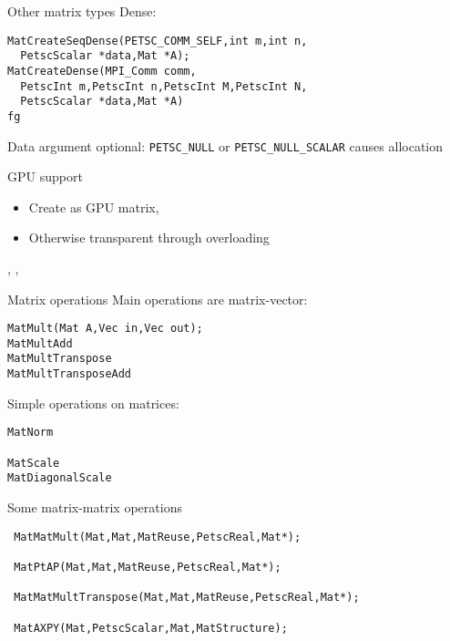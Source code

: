 \begin{details}
\begin{numberedframe}{Other matrix types}
Dense:
\begin{lstlisting}
MatCreateSeqDense(PETSC_COMM_SELF,int m,int n,
  PetscScalar *data,Mat *A);
MatCreateDense(MPI_Comm comm,
  PetscInt m,PetscInt n,PetscInt M,PetscInt N,
  PetscScalar *data,Mat *A)
fg\end{lstlisting}
Data argument optional:
\lstinline{PETSC_NULL} or \lstinline{PETSC_NULL_SCALAR} causes allocation
\end{numberedframe}

\begin{numberedframe}{GPU support}
  \begin{itemize}
  \item Create as GPU matrix,
  \item Otherwise transparent through overloading
  \end{itemize}
,
,
\end{numberedframe}

\begin{numberedframe}{}
\end{numberedframe}

\begin{comment}
  \begin{numberedframe}{}
    \cverbatimsnippet{pccudaallocsp}
  \end{numberedframe}
\end{comment}

\end{details}

\begin{numberedframe}{Matrix operations}
Main operations are matrix-vector:
\begin{lstlisting}
MatMult(Mat A,Vec in,Vec out);
MatMultAdd
MatMultTranspose
MatMultTransposeAdd
\end{lstlisting}

Simple operations on matrices:
\begin{lstlisting}
MatNorm

MatScale
MatDiagonalScale
\end{lstlisting}
\end{numberedframe}

\begin{numberedframe}{Some matrix-matrix operations}
\begin{lstlisting}
 MatMatMult(Mat,Mat,MatReuse,PetscReal,Mat*);

 MatPtAP(Mat,Mat,MatReuse,PetscReal,Mat*);

 MatMatMultTranspose(Mat,Mat,MatReuse,PetscReal,Mat*);

 MatAXPY(Mat,PetscScalar,Mat,MatStructure);
\end{lstlisting}
\end{numberedframe}

